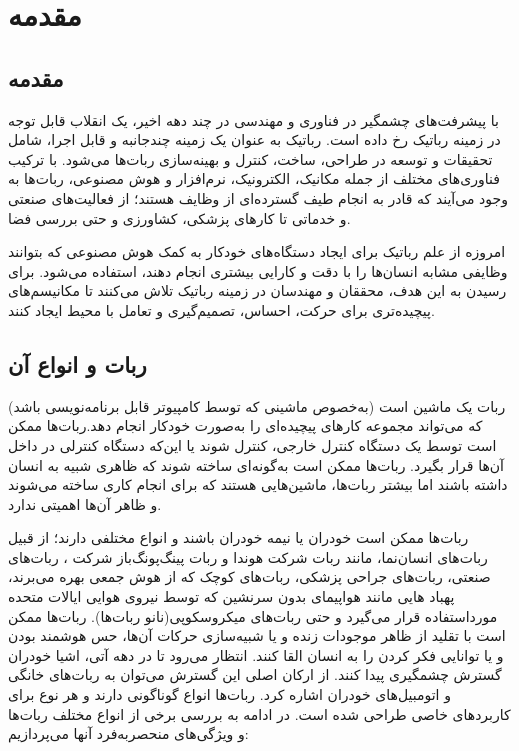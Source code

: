 \chapter{مقدمه}

\section{مقدمه}
با پیشرفت‌های چشمگیر در فناوری و مهندسی در چند دهه اخیر، یک انقلاب قابل توجه در زمینه رباتیک رخ داده است. رباتیک به عنوان یک زمینه چندجانبه و قابل اجرا، شامل تحقیقات و توسعه در طراحی، ساخت، کنترل و بهینه‌سازی ربات‌ها می‌شود. با ترکیب فناوری‌های مختلف از جمله مکانیک، الکترونیک، نرم‌افزار و هوش مصنوعی، ربات‌ها به وجود می‌آیند که قادر به انجام طیف گسترده‌ای از وظایف هستند؛ از فعالیت‌های صنعتی و خدماتی تا کارهای پزشکی، کشاورزی و حتی بررسی فضا.

امروزه از علم رباتیک برای ایجاد دستگاه‌های خودکار به کمک هوش مصنوعی که بتوانند وظایفی مشابه انسان‌ها را با دقت و کارایی بیشتری انجام دهند، استفاده می‌شود. برای رسیدن به این هدف، محققان و مهندسان در زمینه رباتیک تلاش می‌کنند تا مکانیسم‌های پیچیده‌تری برای حرکت، احساس، تصمیم‌گیری و تعامل با محیط ایجاد کنند.

\section[ربات و انواع آن]{ربات و انواع آن\cite{Digiato}}
ربات یک ماشین است (به‌خصوص ماشینی که توسط کامپیوتر قابل برنامه‌نویسی باشد) که می‌تواند مجموعه کارهای پیچیده‌ای را به‌صورت خودکار انجام دهد.ربات‌ها ممکن است توسط یک دستگاه کنترل خارجی، کنترل شوند یا این‌که دستگاه کنترلی در داخل آن‌ها قرار بگیرد. ربات‌ها ممکن است به‌گونه‌ای ساخته شوند که ظاهری شبیه به انسان داشته باشند اما بیشتر ربات‌ها، ماشین‌هایی هستند که برای انجام کاری ساخته می‌شوند و ظاهر آن‌ها اهمیتی ندارد. 

ربات‌ها ممکن است خودران یا نیمه خودران باشند و انواع مختلفی دارند؛ از قبیل ربات‌های انسان‌نما، مانند ربات
 شرکت هوندا و ربات پینگ‌پونگ‌باز شرکت 
، ربات‌های صنعتی، ربات‌های جراحی پزشکی، ربات‌های کوچک که از هوش جمعی بهره می‌برند، پهباد هایی مانند هواپیمای بدون سرنشین
که توسط نیروی هوایی ایالات‌ متحده مورداستفاده قرار می‌گیرد و حتی ربات‌های میکروسکوپی(نانو ربات‌ها)\cite{Digiato}. ربات‌ها ممکن است با تقلید از ظاهر موجودات زنده و یا شبیه‌سازی حرکات آن‌ها، حس هوشمند بودن و یا توانایی فکر کردن را به انسان القا کنند. انتظار می‌رود تا در دهه آتی، اشیا خودران گسترش چشمگیری پیدا کنند. از ارکان اصلی این گسترش می‌توان به ربات‌های خانگی و اتومبیل‌های خودران اشاره کرد.
\newpage
ربات‌ها انواع گوناگونی دارند و هر نوع برای کاربردهای خاصی طراحی شده است. در ادامه به بررسی برخی از انواع مختلف ربات‌ها و ویژگی‌های منحصربه‌فرد آنها می‌پردازیم:


